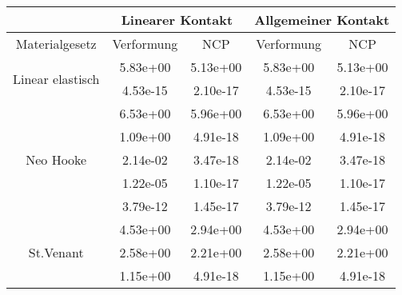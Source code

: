 \begin{table} 
\centering 
\begin{tabular}{c|cc|cc|} 
\cline{2-5} 
 & \multicolumn{2}{|c|}{Linearer Kontakt} & \multicolumn{2}{|c|}{Allgemeiner Kontakt} \\ 
\hline 
\multicolumn{1}{|c|}{Materialgesetz} & \multicolumn{1}{c|}{Verformung} & \multicolumn{1}{c|}{NCP} & \multicolumn{1}{c|}{Verformung} & \multicolumn{1}{c|}{NCP} \\ 
\hline 
\multicolumn{1}{|c|}{\multirow{2}{*}{Linear elastisch}} &\multicolumn{1}{|c|}{  5.83e+00} & \multicolumn{1}{|c|}{  5.13e+00} & \multicolumn{1}{|c|}{  5.83e+00} & \multicolumn{1}{|c|}{  5.13e+00} \\ 
\multicolumn{1}{|c|}{} & \multicolumn{1}{|c|}{  4.53e-15} & \multicolumn{1}{|c|}{  2.10e-17} & \multicolumn{1}{|c|}{  4.53e-15} & \multicolumn{1}{|c|}{  2.10e-17} \\ 
\hline 
\multicolumn{1}{|c|}{\multirow{5}{*}{Neo Hooke}} &\multicolumn{1}{|c|}{  6.53e+00} & \multicolumn{1}{|c|}{  5.96e+00} & \multicolumn{1}{|c|}{  6.53e+00} & \multicolumn{1}{|c|}{  5.96e+00} \\ 
\multicolumn{1}{|c|}{} & \multicolumn{1}{|c|}{  1.09e+00} & \multicolumn{1}{|c|}{  4.91e-18} & \multicolumn{1}{|c|}{  1.09e+00} & \multicolumn{1}{|c|}{  4.91e-18} \\ 
\multicolumn{1}{|c|}{} & \multicolumn{1}{|c|}{  2.14e-02} & \multicolumn{1}{|c|}{  3.47e-18} & \multicolumn{1}{|c|}{  2.14e-02} & \multicolumn{1}{|c|}{  3.47e-18} \\ 
\multicolumn{1}{|c|}{} & \multicolumn{1}{|c|}{  1.22e-05} & \multicolumn{1}{|c|}{  1.10e-17} & \multicolumn{1}{|c|}{  1.22e-05} & \multicolumn{1}{|c|}{  1.10e-17} \\ 
\multicolumn{1}{|c|}{} & \multicolumn{1}{|c|}{  3.79e-12} & \multicolumn{1}{|c|}{  1.45e-17} & \multicolumn{1}{|c|}{  3.79e-12} & \multicolumn{1}{|c|}{  1.45e-17} \\ 
\hline 
\multicolumn{1}{|c|}{\multirow{7}{*}{St.Venant}} &\multicolumn{1}{|c|}{  4.53e+00} & \multicolumn{1}{|c|}{  2.94e+00} & \multicolumn{1}{|c|}{  4.53e+00} & \multicolumn{1}{|c|}{  2.94e+00} \\ 
\multicolumn{1}{|c|}{} & \multicolumn{1}{|c|}{  2.58e+00} & \multicolumn{1}{|c|}{  2.21e+00} & \multicolumn{1}{|c|}{  2.58e+00} & \multicolumn{1}{|c|}{  2.21e+00} \\ 
\multicolumn{1}{|c|}{} & \multicolumn{1}{|c|}{  1.15e+00} & \multicolumn{1}{|c|}{  4.91e-18} & \multicolumn{1}{|c|}{  1.15e+00} & \multicolumn{1}{|c|}{  4.91e-18} \\ 

\end{tabular}
\end{table}
